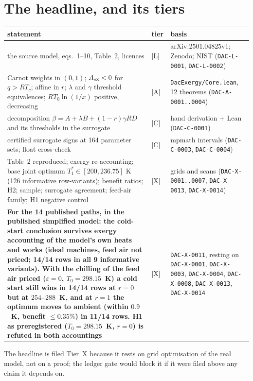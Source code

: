 \documentclass[10pt]{article}
\newcommand{\tier}[1]{\textsf{[#1]}}
\newcommand{\tA}{\tier{A}}
\newcommand{\tL}{\tier{L}}
\newcommand{\tC}{\tier{C}}
\newcommand{\tX}{\tier{X}}
\newcommand{\lean}[1]{\texttt{#1}}
\newcommand{\id}[1]{\texttt{DAC-#1}}
\begin{document}
\section{The headline, and its tiers}\label{sec:head}
\begin{center}\footnotesize\begin{tabular}{p{7.2cm}p{0.9cm}p{5.0cm}}\toprule
statement & tier & basis\\\midrule
the source model, eqs.~1--10, Table~2, licences & \tL & arXiv:2501.04825v1; Zenodo; NIST (\id{L-0001}, \id{L-0002})\\
Carnot weights in $(0,1)$; $A_{\rm ex}<0$ for $q>RT_c$; affine in $r$; $\lambda$ and $\gamma$ threshold equivalences; $RT_0\ln(1/x)$ positive, decreasing & \tA & \lean{DacExergy/Core.lean}, 12 theorems (\id{A-0001..0004})\\
decomposition $\beta=A+\lambda B+(1-r)\gamma RD$ and its thresholds in the surrogate & \tC & hand derivation $+$ Lean (\id{C-0001})\\
certified surrogate signs at 164 parameter sets; float cross-check & \tC & mpmath intervals (\id{C-0003}, \id{C-0004})\\
Table~2 reproduced; exergy re-accounting; base joint optimum $T_1^\ast\in[200,236.75]$ K (126 informative row-variants); benefit ratios; H2; sample; surrogate agreement; feed-air family; H1 negative control & \tX & grids and scans (\id{X-0001..0007}, \id{X-0013}, \id{X-0014})\\
\textbf{For the 14 published paths, in the published simplified model: the cold-start conclusion survives exergy accounting of the model's own heats and works (ideal machines, feed air not priced; 14/14 rows in all 9 informative variants). With the chilling of the feed air priced ($\varepsilon=0$, $T_0=298.15$~K) a cold start still wins in 14/14 rows at $r=0$ but at $254$--$288$~K, and at $r=1$ the optimum moves to ambient (within $0.9$~K, benefit $\le0.35\%$) in 11/14 rows. H1 as preregistered ($T_0=298.15$~K, $r=0$) is refuted in both accountings} & \tX & \id{X-0011}, resting on \id{X-0001}, \id{X-0003}, \id{X-0004}, \id{X-0008}, \id{X-0013}, \id{X-0014}\\\bottomrule
\end{tabular}\end{center}
The headline is filed Tier~X because it rests on grid optimisation of the real model, not on a proof; the ledger gate would block it if it were filed above any claim it depends on.
\end{document}
